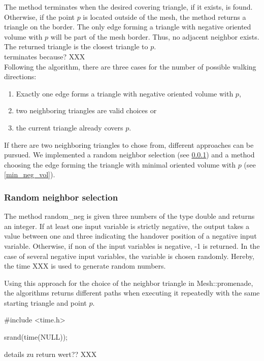 \documentclass[10pt]{article}
\begin{document}
The method terminates when the desired covering triangle, if it exists, is found. Otherwise, if the point $p$ is located outside of the mesh, the method returns a triangle on the border. The only edge forming a triangle with negative oriented volume with $p$ will be part of the mesh border. Thus, no adjacent neighbor exists. The returned triangle is the closest triangle to $p$.\\

terminates because? XXX\\

Following the algorithm, there are three cases for the number of possible walking directions:
\begin{enumerate}
	\item Exactly one edge forms a triangle with negative oriented volume with $p$,
	\item two neighboring triangles are valid choices or
	\item the current triangle already covers $p$.
\end{enumerate}
If there are two neighboring triangles to chose from, different approaches can be pursued. We implemented a random neighbor selection (see \ref{ran_neighb_sel}) and a method choosing the edge forming the triangle with minimal oriented volume with $p$ (see \ref{min_neg_vol}).

\subsubsection{Random neighbor selection} \label{ran_neighb_sel}

The method {\ttfamily random\_neg} is given three numbers of the type {\ttfamily double} and returns an integer. If at least one input variable is strictly negative, the output takes a value between one and three indicating the handover position of a negative input variable. Otherwise, if non of the input variables is negative, -1 is returned. In the case of several negative input variables, the variable is chosen randomly. Hereby, the time XXX is used to generate random numbers.

Using this approach for the choice of the neighbor triangle in {\ttfamily Mesh::promenade}, the algorithms returns different paths when executing it repeatedly with the same starting triangle and point $p$.

\#include <time.h>

srand(time(NULL));

details zu return wert?? XXX
\end{document}
